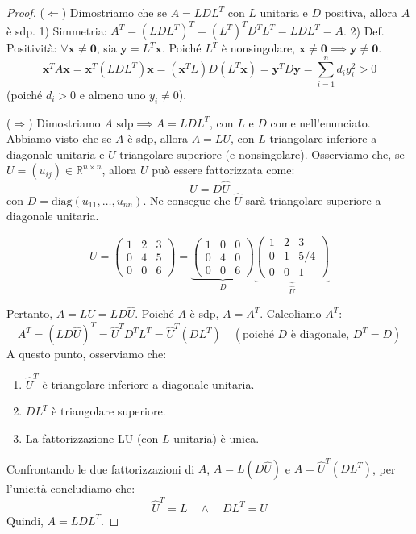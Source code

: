\begin{proof}
($\Leftarrow$) Dimostriamo che se $A=LDL^T$ con $L$ unitaria e $D$ positiva, allora $A$ è sdp.
1) Simmetria: $A^T = (LDL^T)^T = (L^T)^T D^T L^T = L D L^T = A$.
2) Def. Positività: $\forall \mathbf{x} \neq \mathbf{0}$, sia $\mathbf{y} = L^T \mathbf{x}$. Poiché $L^T$ è nonsingolare, $\mathbf{x} \neq \mathbf{0} \implies \mathbf{y} \neq \mathbf{0}$.
$$ \mathbf{x}^T A \mathbf{x} = \mathbf{x}^T (L D L^T) \mathbf{x} = (\mathbf{x}^T L) D (L^T \mathbf{x}) = \mathbf{y}^T D \mathbf{y} = \sum_{i=1}^n d_i y_i^2 > 0 $$
(poiché $d_i > 0$ e almeno uno $y_i \neq 0$).

($\Rightarrow$) Dimostriamo $A \text{ sdp} \implies A=LDL^T$, con $L$ e $D$ come nell'enunciato.
Abbiamo visto che se $A$ è sdp, allora $A=LU$, con $L$ triangolare inferiore a diagonale unitaria e $U$ triangolare superiore (e nonsingolare).
Osserviamo che, se $U=(u_{ij}) \in \mathbb{R}^{n \times n}$, allora $U$ può essere fattorizzata come:
$$ U = D \hat{U} $$
con $D = \text{diag}(u_{11}, \dots, u_{nn})$. Ne consegue che $\hat{U}$ sarà triangolare superiore a diagonale unitaria.

\begin{esempio}
\[ U = \begin{pmatrix} 1 & 2 & 3 \\ 0 & 4 & 5 \\ 0 & 0 & 6 \end{pmatrix} = 
\underbrace{\begin{pmatrix} 1 & 0 & 0 \\ 0 & 4 & 0 \\ 0 & 0 & 6 \end{pmatrix}}_{D}
\underbrace{\begin{pmatrix} 1 & 2 & 3 \\ 0 & 1 & 5/4 \\ 0 & 0 & 1 \end{pmatrix}}_{\hat{U}}
\]
\end{esempio}

Pertanto, $A = LU = L D \hat{U}$.
Poiché $A$ è sdp, $A = A^T$. Calcoliamo $A^T$:
$$ A^T = (L D \hat{U})^T = \hat{U}^T D^T L^T = \hat{U}^T (D L^T) \quad (\text{poiché } D \text{ è diagonale, } D^T=D) $$
A questo punto, osserviamo che:
\begin{enumerate}
    \item $\hat{U}^T$ è triangolare inferiore a diagonale unitaria.
    \item $D L^T$ è triangolare superiore.
    \item La fattorizzazione LU (con $L$ unitaria) è unica.
\end{enumerate}
Confrontando le due fattorizzazioni di $A$, $A = L (D \hat{U})$ e $A = \hat{U}^T (D L^T)$, per l'unicità concludiamo che:
$$ \hat{U}^T = L \quad \land \quad D L^T = U $$
Quindi, $A = L D L^T$.


\end{proof}
